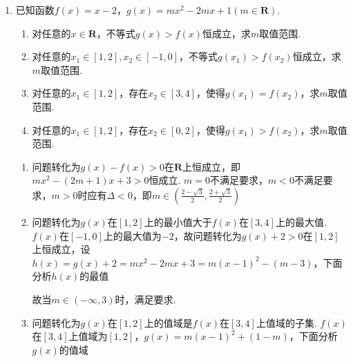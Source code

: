 \begin{enumerate}
\item 已知函数$f(x) = x - 2$，$g(x) = mx^2-2mx+1(m \in \mathbf{R})$. 
\begin{enumerate}
    \item 对任意的$x \in \mathbf{R}$，不等式$g(x) > f(x)$恒成立，求$m$取值范围.
    \item 对任意的$x_1 \in [1, 2], x_2 \in [-1, 0]$，不等式$g(x_1) > f(x_2)$恒成立，求$m$取值范围.
    \item 对任意的$x_1 \in [1, 2]$，存在$x_2 \in [3, 4]$，使得$g(x_1) = f(x_2)$，求$m$取值范围.
    \item 对任意的$x_1 \in [1, 2]$，存在$x_2 \in [0, 2]$，使得$g(x_1) > f(x_2)$，求$m$取值范围.
\end{enumerate}
\begin{jieda}
    \begin{enumerate}
        \item 问题转化为$g(x) - f(x) > 0$在$\mathbf{R}$上恒成立，即$mx^2-(2m+1)x+3 > 0$恒成立. $m = 0$不满足要求，$m < 0$不满足要求，$m > 0$时应有$\Delta < 0$，即$m \in (\frac{2-\sqrt{3}}{2}, \frac{2+\sqrt{3}}{2})$
        \item 问题转化为$g(x)$在$[1, 2]$上的最小值大于$f(x)$在$[3, 4]$上的最大值. $f(x)$在$[-1, 0]$上的最大值为$-2$，故问题转化为$g(x) + 2 > 0$在$[1, 2]$上恒成立，设$h(x) = g(x) + 2 = mx^2-2mx + 3 = m(x-1)^2-(m-3)$，下面分析$h(x)$的最值
        故当$m \in (-\infty, 3)$时，满足要求.
        \item 问题转化为$g(x)$在$[1, 2]$上的值域是$f(x)$在$[3, 4]$上值域的子集. $f(x)$在$[3, 4]$上值域为$[1, 2]$，$g(x) = m(x-1)^2 + (1-m)$，下面分析$g(x)$的值域

\end{enumerate}
\end{jieda}
\end{enumerate}
